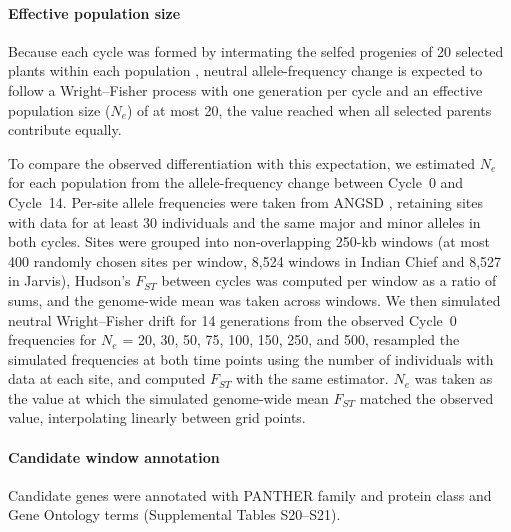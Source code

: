 \documentclass[11pt]{article}
\begin{document}
\paragraph*{Effective population size}
Because each cycle was formed by intermating the selfed progenies of 20 selected plants within each population \citep{MollStuber1971}, neutral allele-frequency change is expected to follow a Wright--Fisher process with one generation per cycle and an effective population size ($N_e$) of at most 20, the value reached when all selected parents contribute equally.

To compare the observed differentiation with this expectation, we estimated $N_e$ for each population from the allele-frequency change between Cycle~0 and Cycle~14. Per-site allele frequencies were taken from ANGSD \citep{Korneliussen2014ANGSD}, retaining sites with data for at least 30 individuals and the same major and minor alleles in both cycles. Sites were grouped into non-overlapping 250-kb windows (at most 400 randomly chosen sites per window, 8,524 windows in Indian Chief and 8,527 in Jarvis), Hudson's $F_{ST}$ \citep{Bhatia2013Fst} between cycles was computed per window as a ratio of sums, and the genome-wide mean was taken across windows. We then simulated neutral Wright--Fisher drift for 14 generations from the observed Cycle~0 frequencies for $N_e$ = 20, 30, 50, 75, 100, 150, 250, and 500, resampled the simulated frequencies at both time points using the number of individuals with data at each site, and computed $F_{ST}$ with the same estimator. $N_e$ was taken as the value at which the simulated genome-wide mean $F_{ST}$ matched the observed value, interpolating linearly between grid points.

\paragraph*{Candidate window annotation}

Candidate genes were annotated with PANTHER family and protein class \citep{Thomas2022PANTHER} and Gene Ontology terms \citep{GO2026} (Supplemental Tables S20--S21).
\end{document}
